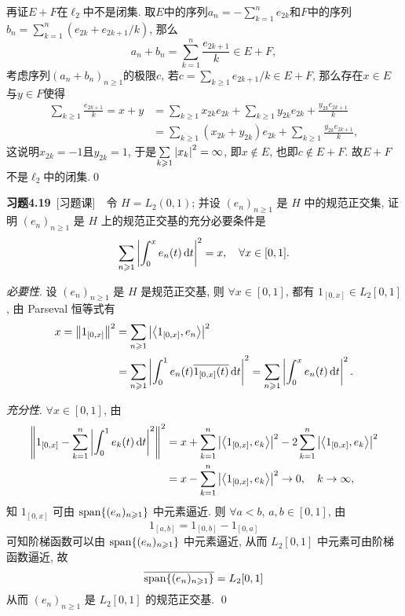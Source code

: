 \begin{Proof}
	再证$ E+F $在$ \ell_2 $中不是闭集. 取$ E $中的序列$ a_n=-\sum\limits_{k=1}^ne_{2k} $和$ F $中的序列$ b_n=\sum\limits_{k=1}^n(e_{2k}+e_{2k+1}/k) $, 那么
	\[
	a_n+b_n=\sum_{k=1}^n\frac{e_{2k+1}}{k}\in E+F,
	\]
	考虑序列$ (a_n+b_n)_{n\geqslant 1} $的极限$ c $, 若$ c=\sum\limits_{k\geqslant 1}e_{2k+1}/k\in E+F $, 那么存在$ x\in E $与$ y\in F $使得
	\[
	\begin{aligned}
	\sum_{k\geqslant 1}\frac{e_{2k+1}}{k}=x+y&=\sum_{k\geqslant 1}x_{2k}e_{2k}+\sum_{k\geqslant 1}y_{2k}e_{2k}+\frac{y_{2k}e_{2k+1}}{k}\\
	&=\sum_{k\geqslant 1}(x_{2k}+y_{2k})e_{2k}+\sum_{k\geqslant 1}\frac{y_{2k}e_{2k+1}}{k},
	\end{aligned}
	\]
	这说明$ x_{2k}=-1 $且$ y_{2k}=1 $, 于是$ \sum\limits_{k\geqslant 1}\left| x_k \right| ^2=\infty $, 即$ x\notin E $, 也即$ c\notin E+F $. 故$ E+F $不是$ \ell_2 $中的闭集.\qed
	\end{Proof}

	\textbf{习题4.19}\ [习题课]\ \ 令 $ H=L_{2}(0, 1) $; 并设 $ (e_{n})_{n\geqslant1} $ 是 $ H $ 中的规范正交集, 证明 $ (e_{n})_{n\geqslant1} $ 是 $ H $ 上的规范正交基的充分必要条件是
	\[
		\sum_{n\geqslant1}\left| \int_{0}^{x}e_{n}(t)\,\mathrm{d} t \right| ^{2} = x, \quad \forall x\in[0, 1].
	\]
	\begin{Proof}
		\textsl{必要性}. 设 $ (e_{n})_{n\geqslant1} $ 是 $ H $ 是规范正交基, 则 $ \forall x\in[0, 1] $, 都有 $ 1_{[0, x]}\in L_{2}[0, 1] $, 由 Parseval 恒等式有
		\[
			\begin{aligned}
				x = \left\| 1_{[0, x]} \right\|^{2} & =\sum_{n\geqslant1}\left| \left\langle 1_{[0, x]}, e_{n} \right\rangle \right| ^{2}\\
				& =\sum_{n\geqslant1}\left| \int_{0}^{1}e_{n}(t)\overline{1_{[0, x]}(t)}\,\mathrm{d} t \right| ^{2}=\sum_{n\geqslant1}\left| \int_{0}^{x}e_{n}(t)\,\mathrm{d} t \right| ^{2}.
			\end{aligned}
		\]

		\textsl{充分性}. $ \forall x\in[0, 1] $, 由
		\[
			\begin{aligned}
				\left\| 1_{[0, x]}-\sum_{k=1}^{n}\left| \int_{0}^{1}e_{k}(t)\,\mathrm{d} t \right| ^{2} \right\|^{2} & = x+\sum_{k=1}^{n}\left| \left\langle 1_{[0, x]}, e_{k} \right\rangle \right| ^{2}-2\sum_{k=1}^{n}\left| \left\langle 1_{[0, x]}, e_{k} \right\rangle \right| ^{2} \\
			& = x-\sum_{k=1}^{n}\left| \left\langle 1_{[0, x]}, e_{k} \right\rangle \right| ^{2}\to 0,\quad k\to\infty,
			\end{aligned}
		\]
		知 $ 1_{[0, x]} $ 可由 $ \operatorname{span}\{ (e_{n})_{n\geqslant1} \} $ 中元素逼近. 则 $ \forall a<b $, $ a, b\in[0, 1] $, 由
		\[
			1_{[a, b]} = 1_{[0, b]}-1_{[0, a]}
		\]
		可知阶梯函数可以由 $ \operatorname{span}\{ (e_{n})_{n\geqslant1} \} $ 中元素逼近, 从而 $ L_{2}[0, 1] $ 中元素可由阶梯函数逼近, 故
		\[
			\overline{\operatorname{span}\{ (e_{n})_{n\geqslant1} \}}=L_{2}[0, 1]
		\]
		从而 $ (e_{n})_{n\geqslant1} $ 是 $ L_{2}[0, 1] $ 的规范正交基. \qed
	\end{Proof}	

